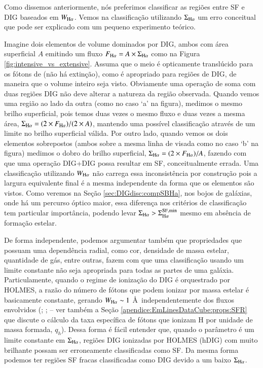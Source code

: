 Como dissemos anteriormente, nós preferimos classificar as regiões entre SF e DIG baseados em $W_{\Ha}$. Vemos na classificação utilizando $\Sigma_{\Ha}$ um erro conceitual que pode ser explicado com um pequeno experimento teórico.

Imagine dois elementos de volume dominados por DIG, ambos com área superficial $A$ emitindo um fluxo $F_{\Ha}=A\times\Sigma_{\Ha}$ como na Figura \ref{fig:intensive_vs_extensive}. Assuma que o meio é opticamente translúcido para os fótons de \Ha (não há extinção), como é apropriado para regiões de DIG, de maneira que o volume inteiro seja visto. Obviamente uma operação de soma com duas regiões DIG não deve alterar a natureza da região observada. Quando vemos uma região ao lado da outra (como no caso `a' na figura), medimos o mesmo brilho superficial, pois temos duas vezes o mesmo fluxo e duas vezes a mesma área, $\Sigma_{\Ha}=(2 \times F_{\Ha})/(2 \times A)$, mantendo uma possível classificação através de um limite no brilho superficial válida. Por outro lado, quando vemos os dois elementos sobrepostos (ambos sobre a mesma linha de visada como no caso `b' na figura) medimos o dobro do brilho superficial, $\Sigma_{\Ha}=(2 \times F_{\Ha})/A$, fazendo com que uma operação DIG+DIG possa resultar em SF, conceitualmente errada.
Uma classificação utilizando $W_{\Ha}$ não carrega essa inconsistência por construção pois a largura equivalente final é a mesma independente da forma que os elementos são vistos. Como veremos na Seção \ref{sec:DIGdisc:compSBHa}, nos bojos de galáxias, onde há um percurso óptico maior, essa diferença nos critérios de classificação tem particular importância, podendo levar $\Sigma_{\Ha} > \Sigma_{\Ha}^{\rm SF,min}$ mesmo em absência de formação estelar.

De forma independente, podemos argumentar também que propriedades que possuam uma dependência radial, como cor, densidade de massa estelar, quantidade de gás, entre outras, fazem com que uma classificação usando um limite constante não seja apropriada para todas as partes de uma galáxia. Particulamente, quando o regime de ionização do DIG é orquestrado por HOLMES, a razão do número de fótons que podem ionizar \Ha por massa estelar é basicamente constante, gerando $W_{\Ha} \sim 1$ \AA\ independentemente dos fluxos envolvidos (\citealt{Binette.etal.1994a}; \citealt{CidFernandes.etal.2011a}; \citealt{Belfiore.etal.2016} -- ver também a Seção \ref{apendice:EmLinesDataCube:props:SFR} que discute o cálculo da taxa específica de fótons que ionizam H por unidade de massa formada, $q_h$). Dessa forma é fácil entender que, quando o parâmetro é um limite constante em $\Sigma_{\Ha}$, regiões DIG ionizadas por HOLMES (hDIG) com \Ha muito brilhante possam ser erroneamente classificadas como SF. Da mesma forma podemos ter regiões SF fracas classificadas como DIG devido a um baixo $\Sigma_{\Ha}$.



